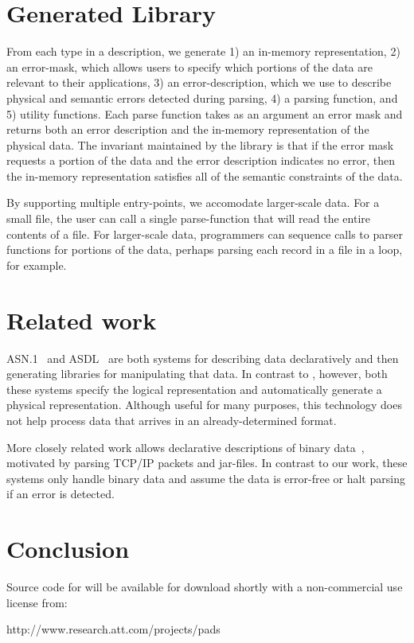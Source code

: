 \documentclass[10pt]{article}
\begin{document}
\section{Generated Library}
From each type in a \pads{} description, we generate 
1) an in-memory representation, 
2) an error-mask, which allows users to specify
which portions of the data are relevant to their applications,
3) an error-description, which we use to describe physical and
semantic errors detected during parsing, 
4) a parsing function, and 
5) utility functions.
Each parse function takes as an argument an error mask and returns
both an error description and the in-memory representation of the
physical data.  
The invariant maintained by the library is that if the error mask
requests a portion of the data and the error description indicates no
error, then the in-memory representation satisfies all of the semantic
constraints of the data. 

By supporting multiple entry-points, we accomodate larger-scale data.
For a small file, the user can call a single parse-function that will
read the entire contents of a file.  For larger-scale data, programmers
can sequence calls to parser functions for portions of the data,
perhaps parsing each record in a file in a loop, for example. 


\section{Related work}
\textsc{ASN.1}~\cite{asn} and \textsc{ASDL}~\cite{asdl} are both
systems for describing data declaratively and then generating
libraries for manipulating that data.  In contrast to \pads{},
however, both these systems specify the logical representation and
automatically generate a physical representation.  Although useful for
many purposes, this technology does not help process data that arrives
in an already-determined format. 

More closely related work allows declarative descriptions of binary
data~\cite{sigcomm00,erlang-bit-syntax,gpce02}, motivated by parsing
\textsc{TCP/IP} packets and \java{} jar-files.  In contrast to our
work, these systems only handle binary data and assume the data is
error-free or halt parsing if an error is detected. 

\section{Conclusion}
Source code for \pads{} will be available for download shortly with
a non-commercial use license from: 
\begin{centercode}
http://www.research.att.com/projects/pads
\end{centercode}
 

\end{document}
